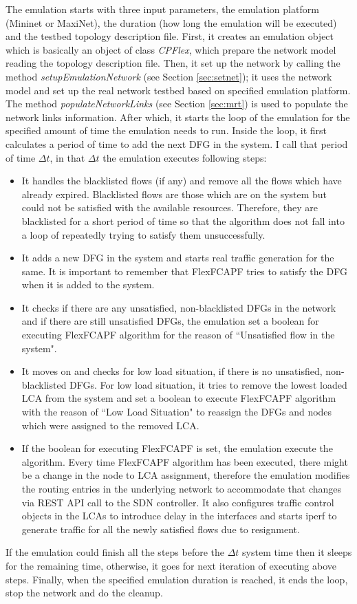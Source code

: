 The emulation starts with three input parameters, the emulation platform (Mininet or MaxiNet), the duration (how long the emulation will be executed) and the testbed topology description file. First, it creates an emulation object which is basically an object of class \textit{CPFlex}, which prepare the network model reading the topology description file. Then, it set up the network by calling the method \textit{setupEmulationNetwork} (see Section \ref{sec:setnet}); it uses the network model and set up the real network testbed based on specified emulation platform. The method \textit{populateNetworkLinks} (see Section \ref{sec:mrt}) is used to populate the network links information. After which, it starts the loop of the emulation for the specified amount of time the emulation needs to run. Inside the loop, it first calculates a period of time to add the next DFG in the system. I call that period of time $\Delta t$, in that $\Delta t$ the emulation executes following steps:
\begin{itemize}
	\item It handles the blacklisted flows (if any) and remove all the flows which have already expired. Blacklisted flows are those which are on the system but could not be satisfied with the available resources. Therefore, they are blacklisted for a short period of time so that the algorithm does not fall into a loop of repeatedly trying to satisfy them unsuccessfully.
	\item It adds a new DFG in the system and starts real traffic generation for the same. It is important to remember that FlexFCAPF tries to satisfy the DFG when it is added to the system.
	\item It checks if there are any unsatisfied, non-blacklisted DFGs in the network and if there are still unsatisfied DFGs, the emulation set a boolean for executing FlexFCAPF algorithm for the reason of ``Unsatisfied flow in the system".
	\item It moves on and checks for low load situation, if there is no unsatisfied, non-blacklisted DFGs. For low load situation, it tries to remove the lowest loaded LCA from the system and set a boolean to execute FlexFCAPF algorithm with the reason of ``Low Load Situation" to reassign the DFGs and nodes which were assigned to the removed LCA.
	\item If the boolean for executing FlexFCAPF is set, the emulation execute the algorithm. Every time FlexFCAPF algorithm has been executed, there might be a change in the node to LCA assignment, therefore the emulation modifies the routing entries in the underlying network to accommodate that changes via REST API call to the SDN controller. It also configures traffic control objects in the LCAs to introduce delay in the interfaces and starts iperf to generate traffic for all the newly satisfied flows due to resignment.
\end{itemize}
If the emulation could finish all the steps before the $\Delta t$ system time then it sleeps for the remaining time, otherwise, it goes for next iteration of executing above steps. Finally, when the specified emulation duration is reached, it ends the loop, stop the network and do the cleanup.
